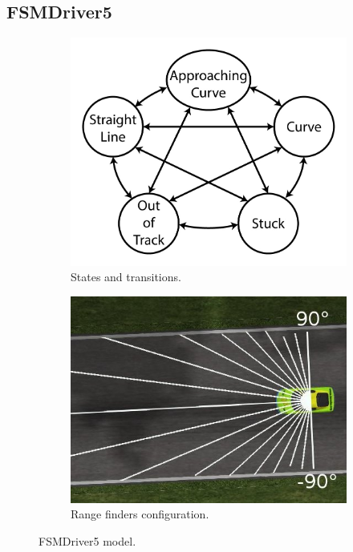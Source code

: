 


\subsection{FSMDriver5}

\begin{figure}
\centering
\begin{subfigure}[b]{0.4\textwidth}
   \includegraphics[width=\textwidth]{img/FiveStateFSM}
   \caption{States and transitions.}\label{fig:FSMDriver5Model}%
\end{subfigure}
\hfill
\begin{subfigure}[b]{0.4\textwidth}
   \includegraphics[width=\textwidth]{img/FSM5Sensors}
   \caption{Range finders configuration.}\label{fig:FSMDriver5Finders}%
\end{subfigure}
   \caption{FSMDriver5 model.}\label{fig:FSMDriver5}
\end{figure}

